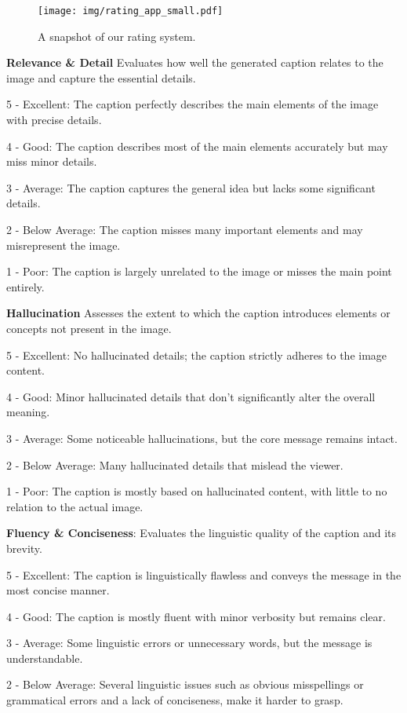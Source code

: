 \documentclass[journal]{IEEEtran}
\begin{document}
\begin{figure}[H]
    \centering
    \texttt{[image: img/rating\_app\_small.pdf]}
    \caption{A snapshot of our rating system.}
\end{figure}


\textbf{Relevance \& Detail}
Evaluates how well the generated caption relates to the image and capture the essential details.

5 - Excellent: The caption perfectly describes the main elements of the image with precise details.

4 - Good: The caption describes most of the main elements accurately but may miss minor details.

3 - Average: The caption captures the general idea but lacks some significant details.

2 - Below Average: The caption misses many important elements and may misrepresent the image.

1 - Poor: The caption is largely unrelated to the image or misses the main point entirely.


\textbf{Hallucination}
Assesses the extent to which the caption introduces elements or concepts not present in the image.

5 - Excellent: No hallucinated details; the caption strictly adheres to the image content.

4 - Good: Minor hallucinated details that don't significantly alter the overall meaning.

3 - Average: Some noticeable hallucinations, but the core message remains intact.

2 - Below Average: Many hallucinated details that mislead the viewer.

1 - Poor: The caption is mostly based on hallucinated content, with little to no relation to the actual image.


\textbf{Fluency \& Conciseness}:
Evaluates the linguistic quality of the caption and its brevity.

5 - Excellent: The caption is linguistically flawless and conveys the message in the most concise manner.

4 - Good: The caption is mostly fluent with minor verbosity but remains clear.

3 - Average: Some linguistic errors or unnecessary words, but the message is understandable.

2 - Below Average: Several linguistic issues such as obvious misspellings or grammatical errors and a lack of conciseness, make it harder to grasp.
\end{document}
